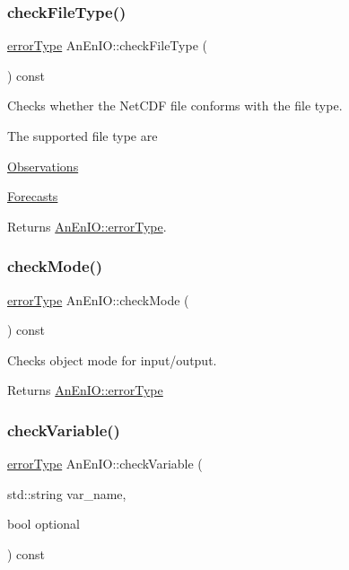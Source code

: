 \subsubsection{\texorpdfstring{check\+File\+Type()}{checkFileType()}}
{\footnotesize\ttfamily \mbox{\hyperlink{class_an_en_i_o_aa56bc1ec6610b86db4349bce20f9ead0}{error\+Type}} An\+En\+I\+O\+::check\+File\+Type (\begin{DoxyParamCaption}{ }\end{DoxyParamCaption}) const}

Checks whether the Net\+C\+DF file conforms with the file type.

The supported file type are
\begin{DoxyItemize}
\item \mbox{\hyperlink{class_observations}{Observations}}
\item \mbox{\hyperlink{class_forecasts}{Forecasts}}
\end{DoxyItemize}

\begin{DoxyReturn}{Returns}
\mbox{\hyperlink{class_an_en_i_o_aa56bc1ec6610b86db4349bce20f9ead0}{An\+En\+I\+O\+::error\+Type}}. 
\end{DoxyReturn}
\mbox{\label{class_an_en_i_o_a2dbb61800810628c09158882d3727478}} 
\subsubsection{\texorpdfstring{check\+Mode()}{checkMode()}}
{\footnotesize\ttfamily \mbox{\hyperlink{class_an_en_i_o_aa56bc1ec6610b86db4349bce20f9ead0}{error\+Type}} An\+En\+I\+O\+::check\+Mode (\begin{DoxyParamCaption}{ }\end{DoxyParamCaption}) const}

Checks object mode for input/output.

\begin{DoxyReturn}{Returns}
\mbox{\hyperlink{class_an_en_i_o_aa56bc1ec6610b86db4349bce20f9ead0}{An\+En\+I\+O\+::error\+Type}} 
\end{DoxyReturn}
\mbox{\label{class_an_en_i_o_ab7f3ba245b7acb11184e0a5b3490a84b}} 
\subsubsection{\texorpdfstring{check\+Variable()}{checkVariable()}}
{\footnotesize\ttfamily \mbox{\hyperlink{class_an_en_i_o_aa56bc1ec6610b86db4349bce20f9ead0}{error\+Type}} An\+En\+I\+O\+::check\+Variable (\begin{DoxyParamCaption}\item[{std\+::string}]{var\+\_\+name,  }\item[{bool}]{optional }\end{DoxyParamCaption}) const}

